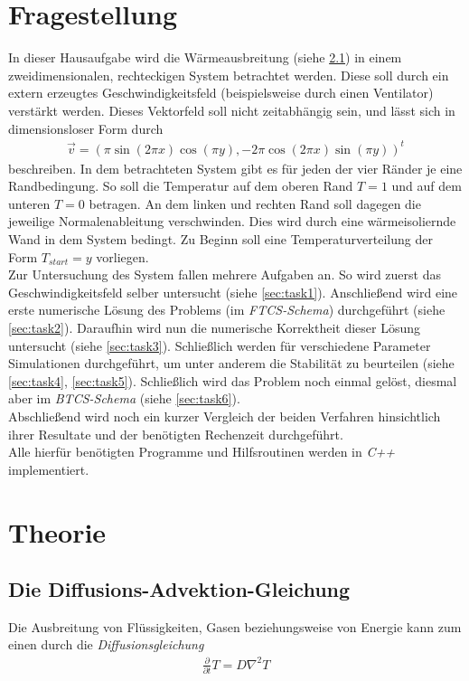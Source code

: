 \documentclass[12pt,a4paper,titlepage,headinclude,bibtotoc]{scrartcl}
\begin{document}
\section{Fragestellung}
\label{sec:fragestellung}
In dieser Hausaufgabe wird die Wärmeausbreitung (siehe \ref{sec:diff_adv}) in einem zweidimensionalen, rechteckigen System betrachtet werden. Diese soll durch ein extern erzeugtes Geschwindigkeitsfeld (beispielsweise durch einen Ventilator) verstärkt werden. Dieses Vektorfeld soll nicht zeitabhängig sein, und lässt sich in dimensionsloser Form durch
\begin{align*}
\vec{v} = (\pi \sin(2\pi x) \cos(\pi y), -2 \pi \cos(2\pi x) \sin(\pi y))^t
\end{align*}
beschreiben. In dem betrachteten System gibt es für jeden der vier Ränder je eine Randbedingung. So soll die Temperatur auf dem oberen Rand $T=1$ und auf dem unteren $T=0$ betragen. An dem linken und rechten Rand soll dagegen die jeweilige Normalenableitung verschwinden. Dies wird durch eine wärmeisoliernde Wand in dem System bedingt. Zu Beginn soll eine Temperaturverteilung der Form $T_{start} = y$ vorliegen.\\

Zur Untersuchung des System fallen mehrere Aufgaben an. So wird zuerst das Geschwindigkeitsfeld selber untersucht (siehe \ref{sec:task1}). Anschließend wird eine erste numerische Lösung des Problems (im \textit{FTCS-Schema}) durchgeführt (siehe \ref{sec:task2}). Daraufhin wird nun die numerische Korrektheit dieser Lösung untersucht (siehe \ref{sec:task3}). Schließlich werden für verschiedene Parameter Simulationen durchgeführt, um unter anderem die Stabilität zu beurteilen (siehe \ref{sec:task4}, \ref{sec:task5}). Schließlich wird das Problem noch einmal gelöst, diesmal aber im \textit{BTCS-Schema} (siehe \ref{sec:task6}).\\
Abschließend wird noch ein kurzer Vergleich der beiden Verfahren hinsichtlich ihrer Resultate und der benötigten Rechenzeit durchgeführt.\\
Alle hierfür benötigten Programme und Hilfsroutinen werden in \textit{C++} implementiert.

\section{Theorie}
\label{sec:theorie}
\subsection{Die Diffusions-Advektion-Gleichung}
\label{sec:diff_adv}
Die Ausbreitung von Flüssigkeiten, Gasen beziehungsweise von Energie kann zum einen durch die \textit{Diffusionsgleichung}
\begin{align}
\label{eq:diff}
\frac{\partial}{\partial t}T = D \nabla^2 T 
\end{align}
\end{document}
